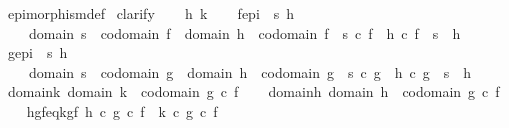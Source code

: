 \begin{isabellebody}
\isamarkupfalse%
\ epimorphism{\isacharunderscore}{\kern0pt}def\isanewline
{}\isamarkupfalse%
\ clarify\isanewline
\ \ \isamarkupfalse%
\ h\ k\isanewline
\ \ \isamarkupfalse%
\ f{\isacharunderscore}{\kern0pt}epi\ {\isacharcolon}{\kern0pt}{\isachardoublequoteopen}{\isasymforall}\ s\ h{\isachardot}{\kern0pt}\isanewline
\ \ \ \ {\isacharparenleft}{\kern0pt}domain\ s\ {\isacharequal}{\kern0pt}\ codomain\ f\ {\isasymand}\ domain\ h\ {\isacharequal}{\kern0pt}\ codomain\ f{\isacharparenright}{\kern0pt}\ {\isasymlongrightarrow}\ {\isacharparenleft}{\kern0pt}s\ {\isasymcirc}\isactrlsub c\ f\ {\isacharequal}{\kern0pt}\ h\ {\isasymcirc}\isactrlsub c\ f\ {\isasymlongrightarrow}\ s\ {\isacharequal}{\kern0pt}\ h{\isacharparenright}{\kern0pt}{\isachardoublequoteclose}\isanewline
\ \ \isamarkupfalse%
\ g{\isacharunderscore}{\kern0pt}epi\ {\isacharcolon}{\kern0pt}{\isachardoublequoteopen}{\isasymforall}\ s\ h{\isachardot}{\kern0pt}\isanewline
\ \ \ \ {\isacharparenleft}{\kern0pt}domain\ s\ {\isacharequal}{\kern0pt}\ codomain\ g\ {\isasymand}\ domain\ h\ {\isacharequal}{\kern0pt}\ codomain\ g{\isacharparenright}{\kern0pt}\ {\isasymlongrightarrow}\ {\isacharparenleft}{\kern0pt}s\ {\isasymcirc}\isactrlsub c\ g\ {\isacharequal}{\kern0pt}\ h\ {\isasymcirc}\isactrlsub c\ g\ {\isasymlongrightarrow}\ s\ {\isacharequal}{\kern0pt}\ h{\isacharparenright}{\kern0pt}{\isachardoublequoteclose}\isanewline
\ \ \isamarkupfalse%
\ domain{\isacharunderscore}{\kern0pt}k{\isacharcolon}{\kern0pt}\ {\isachardoublequoteopen}domain\ k\ {\isacharequal}{\kern0pt}\ codomain\ {\isacharparenleft}{\kern0pt}g\ {\isasymcirc}\isactrlsub c\ f{\isacharparenright}{\kern0pt}{\isachardoublequoteclose}\isanewline
\ \ \isamarkupfalse%
\ domain{\isacharunderscore}{\kern0pt}h{\isacharcolon}{\kern0pt}\ {\isachardoublequoteopen}domain\ h\ {\isacharequal}{\kern0pt}\ codomain\ {\isacharparenleft}{\kern0pt}g\ {\isasymcirc}\isactrlsub c\ f{\isacharparenright}{\kern0pt}{\isachardoublequoteclose}\isanewline
\ \ \isamarkupfalse%
\ hgf{\isacharunderscore}{\kern0pt}eq{\isacharunderscore}{\kern0pt}kgf{\isacharcolon}{\kern0pt}\ {\isachardoublequoteopen}h\ {\isasymcirc}\isactrlsub c\ {\isacharparenleft}{\kern0pt}g\ {\isasymcirc}\isactrlsub c\ f{\isacharparenright}{\kern0pt}\ {\isacharequal}{\kern0pt}\ k\ {\isasymcirc}\isactrlsub c\ {\isacharparenleft}{\kern0pt}g\ {\isasymcirc}\isactrlsub c\ f{\isacharparenright}{\kern0pt}{\isachardoublequoteclose}\isanewline
\ \ \isanewline
\ \ \isamarkupfalse%

\end{isabellebody}
